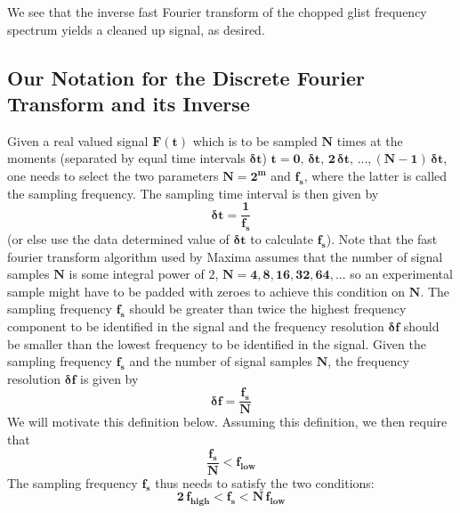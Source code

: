 \documentclass[11pt]{article}
\begin{document}

\noindent \normalsize We see that the inverse fast Fourier transform of the chopped glist frequency spectrum
  yields a cleaned up signal, as desired.
\newpage
\subsection{Our Notation for the Discrete Fourier Transform and its Inverse} \label{notate}
Given a real valued signal $\mathbf{F(t)}$ which is to be sampled $\mathbf{N}$ times 
  at the moments (separated by equal time intervals $\mathbf{\boldsymbol{\delta}t}$)
 $\mathbf{t = 0,\, \boldsymbol{\delta}t,\, 2\,\boldsymbol{\delta}t,\,...,(N-1)\,\boldsymbol{\delta}t}$,
one needs to select the two parameters $\mathbf{N = 2^{m}}$ and $\mathbf{f_{s}}$, where the latter
  is called the sampling frequency.
The sampling time interval is then given by
\begin{equation}  \label{Eq:dt}
\mathbf{\boldsymbol{\delta}t} = \mathbf{\frac{1}{f_{s}}}
\end{equation}
(or else use the data determined value of $\mathbf{\boldsymbol{\delta}t}$ to
  calculate $\mathbf{f_{s}}$).
Note that the fast fourier transform algorithm used by Maxima assumes that
  the number of signal samples $\mathbf{N}$ is some integral power of $2$, 
  $\mathbf{N = 4, 8, 16, 32, 64, ...}$ so an experimental sample might have 
  to be padded with zeroes to achieve this condition on $\mathbf{N}$.
The sampling frequency $\mathbf{f_{s}}$  should be greater than twice the 
  highest frequency component to be identified in
  the signal and the frequency resolution $\mathbf{\boldsymbol{\delta}f}$
  should be smaller than the lowest frequency to be identified in the signal.
Given the sampling frequency $\mathbf{f_{s}}$ and the number of signal samples
  $\mathbf{N}$, the frequency resolution $\mathbf{\boldsymbol{\delta}f}$ is
  given by
\begin{equation}  \label{Eq:df}
\mathbf{\boldsymbol{\delta}f} = \mathbf{\frac{f_{s}}{N}}
\end{equation}
We will motivate this definition below.
Assuming this definition, we then require that
\begin{equation}
\mathbf{ \frac{f_{s}}{N} < f_{low} }
\end{equation}
The sampling frequency $\mathbf{f_{s}}$ thus needs to satisfy the two conditions:
\begin{equation}  \label{Eq:highlow}
\mathbf{ 2\, f_{high} < f_{s} < N\,f_{low} }
\end{equation}
\end{document}
